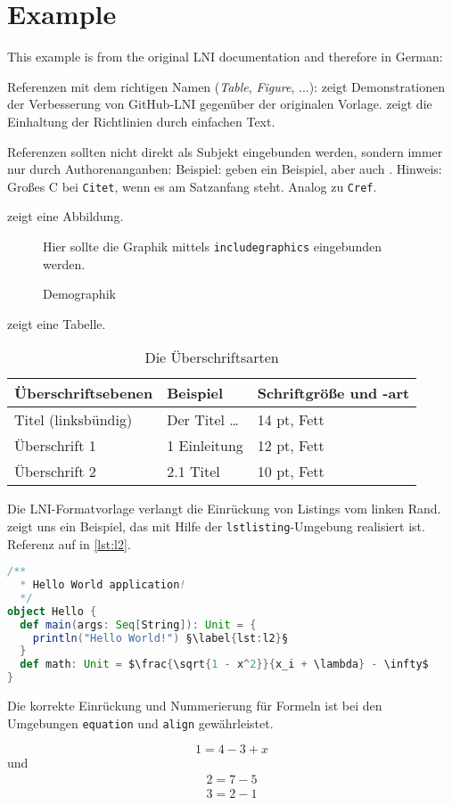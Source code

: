 
\section{Example}
\label{sec:lniconformance}
This example is from the original LNI documentation and therefore in German:

Referenzen mit dem richtigen Namen (\textit{Table}, \textit{Figure}, ...):
 zeigt Demonstrationen der Verbesserung von GitHub-LNI gegenüber der originalen Vorlage.
 zeigt die Einhaltung der Richtlinien durch einfachen Text.

Referenzen sollten nicht direkt als Subjekt eingebunden werden, sondern immer nur durch Authorenanganben:
Beispiel:  geben ein Beispiel, aber auch \citet{Az09}.
Hinweis: Großes C bei \texttt{Citet}, wenn es am Satzanfang steht. Analog zu \texttt{Cref}.

 zeigt eine Abbildung.

\begin{figure}
  \centering
  Hier sollte die Graphik mittels \texttt{includegraphics} eingebunden werden.

  \caption{Demographik}
  \label{fig:demo}
\end{figure}

 zeigt eine Tabelle.

\begin{table}
  \centering
  \begin{tabular}{lll}
    \toprule
    Überschriftsebenen & Beispiel & Schriftgröße und -art \\
    \midrule
    Titel (linksbündig) & Der Titel \ldots & 14 pt, Fett\\
    Überschrift 1 & 1 Einleitung & 12 pt, Fett\\
    Überschrift 2 & 2.1 Titel & 10 pt, Fett\\
    \bottomrule
  \end{tabular}
  \caption{Die Überschriftsarten}
  \label{tab:demo}
\end{table}
               
Die LNI-Formatvorlage verlangt die Einrückung von Listings vom linken Rand.
 zeigt uns ein Beispiel, das mit Hilfe der \texttt{lstlisting}-Umgebung realisiert ist.
Referenz auf  in \cref{lst:l2}.

\begin{lstlisting}[caption=Beschreibung, label=L1, language=Scala]
/**
  * Hello World application!
  */
object Hello { 
  def main(args: Seq[String]): Unit = {
    println("Hello World!") §\label{lst:l2}§
  }
  def math: Unit = $\frac{\sqrt{1 - x^2}}{x_i + \lambda} - \infty$
}
\end{lstlisting}

Die korrekte Einrückung und Nummerierung für Formeln ist bei den Umgebungen \texttt{equation} und \texttt{align} gewährleistet.

\begin{equation}
  1=4-3 + x
\end{equation}
und
\begin{align}
  2=7-5\\
  3=2-1
\end{align}
